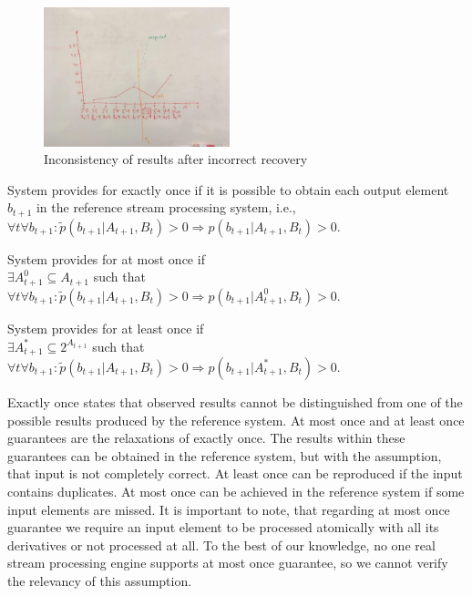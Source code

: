 \begin{figure}[htbp]
  \centering
  \includegraphics[width=0.48\textwidth]{pics/state-inconsistency}
  \caption{Inconsistency of results after incorrect recovery}
  \label {state-inconsistency}
\end{figure}

\begin{definition}{System provides for exactly once}
if it is possible to obtain each output element $b_{t+1}$ in the reference stream processing system, i.e.,\\ 
$\forall{t} \forall{b_{t+1}}: \widetilde{p}(b_{t+1}|A_{t+1},B_t)>0 \Rightarrow p(b_{t+1}|A_{t+1},B_t)>0$.
\end{definition}

\begin{definition}{System provides for at most once}
if \\
$\exists{A^{0}_{t+1}\subseteq{A_{t+1}}}$ such that \\
$\forall{t} \forall{b_{t+1}}: \widetilde{p}(b_{t+1}|A_{t+1},B_t)>0 \Rightarrow p(b_{t+1}|A^{0}_{t+1},B_t)>0$.
\end{definition}

\begin{definition}{System provides for at least once}
if \\
$\exists{A^{*}_{t+1}\subseteq{2^{A_{t+1}}}}$ such that \\
$\forall{t} \forall{b_{t+1}}: \widetilde{p}(b_{t+1}|A_{t+1},B_t)>0 \Rightarrow p(b_{t+1}|A^{*}_{t+1},B_t)>0$.
\end{definition}

Exactly once states that observed results cannot be distinguished from one of the possible results produced by the reference system. At most once and at least once guarantees are the relaxations of exactly once. The results within these guarantees can be obtained in the reference system, but with the assumption, that input is not completely correct. At least once can be reproduced if the input contains duplicates. At most once can be achieved in the reference system if some input elements are missed. It is important to note, that regarding at most once guarantee we require an input element to be processed atomically with all its derivatives or not processed at all. To the best of our knowledge, no one real stream processing engine supports at most once guarantee, so we cannot verify the relevancy of this assumption. 

